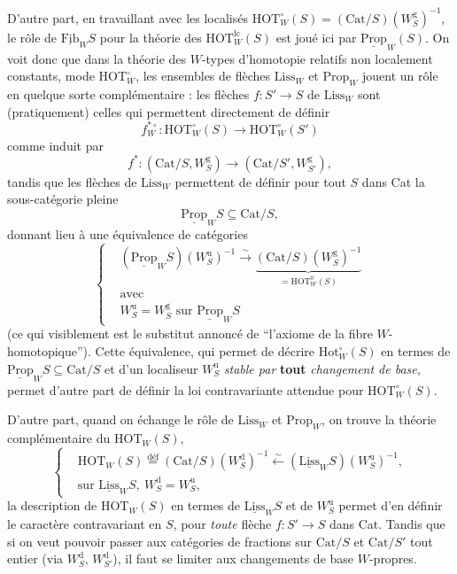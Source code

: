 \documentclass[11pt]{article}
\newcommand{\printedpage}[1]{{\reversemarginpar\marginnote{\raggedleft\scriptsize ed.~#1}}}
\newcommand{\msp}[1]{\marginpar{\raggedright\scriptsize ms.~#1}}
\newcommand{\deff}{\overset{\text{déf}}{=}}
\begin{document}
D'autre part, en travaillant avec les localisés $\mathrm{HOT}^\circ_W(S) = (\mathrm{Cat}/S)(W^{\mathrm{g}}_S)^{-1}$, le rôle de $\underline{\mathrm{Fib}}_W S$ pour la théorie des $\mathrm{HOT}^{\mathrm{lc}}_W(S)$ est joué ici par $\underline{\mathrm{Prop}}_W(S)$. On voit donc que dans la théorie des $W$-types d'homotopie relatifs non localement constants, mode $\mathrm{HOT}^\circ_W$, les ensembles de flèches $\mathrm{Liss}_W$ et $\mathrm{Prop}_W$ jouent un rôle en quelque sorte complémentaire : les flèches $f : S' \longrightarrow S$ de $\mathrm{Liss}_W$ sont (pratiquement) celles qui permettent directement de définir
\[
f^{*\circ}_W : \mathrm{HOT}^\circ_W(S) \longrightarrow \mathrm{HOT}^\circ_W(S')
\]
comme induit par
\[
f^* : (\mathrm{Cat}/S, W^{\mathrm{g}}_S) \longrightarrow (\mathrm{Cat}/S', W^{\mathrm{g}}_{S'}),
\]
tandis que les flèches de $\mathrm{Liss}_W$ permettent de définir pour tout $S$ dans Cat la sous-catégorie pleine
\[
\underline{\mathrm{Prop}}_W S \subseteq \mathrm{Cat}/S,
\]
donnant lieu à une équivalence de catégories
\[
\left\{
\begin{aligned}
&(\underline{\mathrm{Prop}}_W S)(W^{\mathrm{u}}_S)^{-1} \xrightarrow{\sim} \underbrace{(\mathrm{Cat}/S)(W^{\mathrm{g}}_S)^{-1}}_{= \mathrm{HOT}^0_W(S)} %
\\
&\text{avec}\\
&W^{\mathrm{u}}_S = W^{\mathrm{g}}_S \text{ sur } \underline{\mathrm{Prop}}_W S
\end{aligned}
\right.
\]
(ce qui visiblement est le substitut annoncé de ``l'axiome de la fibre $W$-homotopique''). Cette
\msp{page 224}
équivalence, qui permet de décrire $\mathrm{Hot}^\circ_W(S)$ en termes de $\underline{\mathrm{Prop}}_W S \subseteq \mathrm{Cat}/S$ et d'un localiseur $W^{\mathrm{u}}_S$ \textit{stable par} \textbf{tout} \textit{changement de base,} permet d'autre part de définir la loi contravariante attendue pour $\mathrm{HOT}^\circ_W(S)$.

\printedpage{143}

D'autre part, quand on échange le rôle de $\mathrm{Liss}_W$ et $\mathrm{Prop}_W$, on trouve la théorie complémentaire du $\mathrm{HOT}_W(S)$,
\[
\left\{
\begin{aligned}
&\mathrm{HOT}_W(S) \deff (\mathrm{Cat}/S)(W^{\mathrm{d}}_S)^{-1} \xleftarrow{\sim} (\underline{\mathrm{Liss}}_W S)(W^{\mathrm{u}}_S)^{-1},\\
&\text{sur } \underline{\mathrm{Liss}}_W S,\ W^{\mathrm{d}}_S = W^{\mathrm{u}}_S,
\end{aligned}
\right.
\]
la description de $\mathrm{HOT}_W(S)$ en termes de $\underline{\mathrm{Liss}}_W S$ et de $W^{\mathrm{u}}_S$ permet d'en définir le caractère contravariant en $S$, pour \textit{toute} flèche $f : S' \longrightarrow S$ dans Cat. Tandis que si on veut pouvoir passer aux catégories de fractions sur $\mathrm{Cat}/S$ et $\mathrm{Cat}/S'$ tout entier (via $W^{\mathrm{d}}_S$, $W^{\mathrm{d}}_{S'}$), il faut se limiter aux changements de base $W$-propres.
\end{document}
